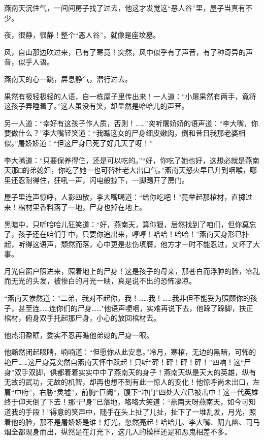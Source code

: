 \documentclass[12pt,oneside]{book}
\begin{document}
燕南天沉住气，一间间房子找了过去，他这才发觉这``恶人谷''里，屋子当真有不少。

夜，很静，很静！整个``恶人谷''，就像是座坟墓。

风，自山那边吹过来，已有了寒竟！突然，风中似乎有了声音，有了种奇异的声音，似乎人语。

燕南天的心一跳，屏息静气，潜行过去。

果然有极轻极轻的人语，自一栋屋子里传出来！一人道：``小屠果然有两手，竟将这孩子弄睡着了。''这人虽没有笑，却显然是哈哈儿的声音。

另一人道：``幸好有这孩子作人质，否则！\ldots\ldots{}''突听屠娇娇的语声道：``李大嘴，你要做什么？''李大嘴轻笑道：``我瞧这女的尸身细皮嫩肉，倒和昔日我那老婆相似。''屠娇娇道：``但这尸身已死了好几天了呀！''

李大嘴道：``只要保养得住，还是可以吃的。''``好，你吃了她也好，这想必就是燕南天那□的弟媳妇，你吃了她一也可替杜老大出口气。''燕南天怒火早已升到咽喉，哪里还忍耐得住，狂吼一声，闪电般掠下，一脚踢开了房门。

屋子里连声惊呼，人影四散，李大嘴喝道：``给你吃吧！''竟举起那棺材，直掷过来！棺材里香料落了一地，尸身也掉在地上。

黑暗中，只听哈哈儿狂笑道：``好，燕南天，算你狠，居然找到了咱们，但你莫忘了，孩子还在咱们手中，只要你追出来，哼哼！哈哈！哈哈！''燕南天身形已扑起，听得这语声，颓然而落，心中更是悲伤填膺，他方才一时不能忍过，又坏了大事。

月光自窗户照进来，照着地上的尸身！这是孩子的母亲，那苍白而浮肿的脸，零乱而无光的头发，被惨白的月光一映，真是说不出的恐怖凄凉。

``燕南天惨然道：''二弟，我对不起你，我！\ldots\ldots 我！\ldots\ldots 我非但不能妥为照顾你的孩子，甚至连\ldots\ldots 连你们的尸身\ldots\ldots"他语声哽咽，实难再说下去，他跺了跺脚，扶正棺材，俯身双手托起那尸身，小心的放回棺材去。

他热泪盈眶，委实不忍再瞧他弟媳的尸身一眼。

他黯然闭起眼睛，喃喃道：``但愿你从此安息。''冷月，寒棺，无边的黑暗，可怖的艳尸\ldots\ldots 这尸身竞突然自燕南天怀中跃起！只听``砰！砰！砰！砰！''四响！这``尸身''双手双脚，俱都着着实实中中了燕南天的身子！燕南天纵是天大的英雄，纵有无故的武功，无故的机智，却再也想不到有此一惊人的变化！他惊呼尚未出口，左肩``中府''，右胁``灵墟''，前胸``巨阙''，腹下``冲门''四处大穴已被击中！这一代英雄终于仰天倒了下去！那``尸身''已落地，咯咯大笑道：``燕南天呀燕南天，如今可知道我的手段！''得意的笑声中，随手在头上扯了儿扯，扯下了一堆乱发，月光，照着他的脸，那不是屠娇娇是谁！灯光，忽然亮起！哈哈儿、李大嘴、阴九幽、司马烟全都现身而出，纵然是在灯光下，这几人的模样还是和恶鬼相差不多。
\end{document}
